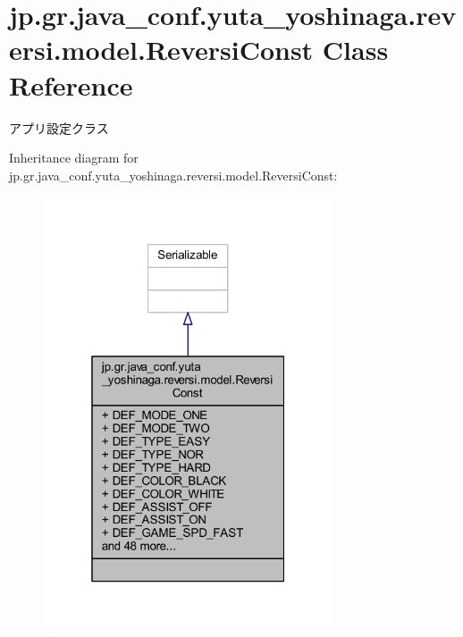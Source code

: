 \hypertarget{classjp_1_1gr_1_1java__conf_1_1yuta__yoshinaga_1_1reversi_1_1model_1_1_reversi_const}{}\section{jp.\+gr.\+java\+\_\+conf.\+yuta\+\_\+yoshinaga.\+reversi.\+model.\+Reversi\+Const Class Reference}
\label{classjp_1_1gr_1_1java__conf_1_1yuta__yoshinaga_1_1reversi_1_1model_1_1_reversi_const}


アプリ設定クラス  




Inheritance diagram for jp.\+gr.\+java\+\_\+conf.\+yuta\+\_\+yoshinaga.\+reversi.\+model.\+Reversi\+Const\+:\nopagebreak
\begin{figure}[H]
\begin{center}
\leavevmode
\includegraphics[width=241pt]{classjp_1_1gr_1_1java__conf_1_1yuta__yoshinaga_1_1reversi_1_1model_1_1_reversi_const__inherit__graph}
\end{center}
\end{figure}


